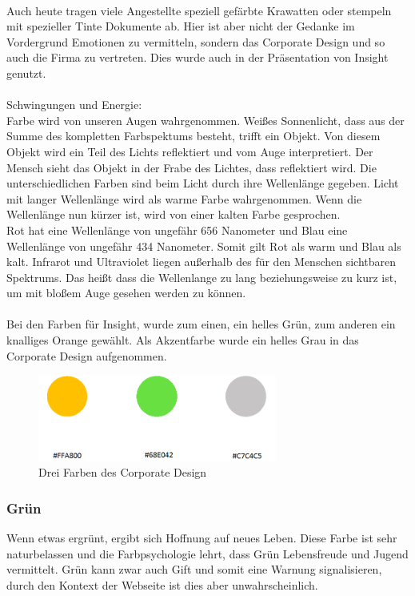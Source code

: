 \leavevmode \\
Auch heute tragen viele Angestellte speziell gefärbte Krawatten oder stempeln mit spezieller Tinte Dokumente ab. Hier ist aber nicht der Gedanke im Vordergrund Emotionen zu vermitteln, sondern das Corporate Design und so auch die Firma zu vertreten. Dies wurde auch in der Präsentation von Insight genutzt.
\leavevmode \\
\leavevmode \\
Schwingungen und Energie\cite{farbwirkung}:
\leavevmode \\
Farbe wird von unseren Augen wahrgenommen. Weißes Sonnenlicht, dass aus der Summe des kompletten Farbspektums besteht, trifft ein Objekt. Von diesem Objekt wird ein Teil des Lichts reflektiert und vom Auge interpretiert. Der Mensch sieht das Objekt in der Frabe des Lichtes, dass reflektiert wird. Die unterschiedlichen Farben sind beim Licht durch ihre Wellenlänge gegeben. Licht mit langer Wellenlänge wird als warme Farbe wahrgenommen. Wenn die Wellenlänge nun kürzer ist, wird von einer kalten Farbe gesprochen.
\leavevmode \\
Rot hat eine Wellenlänge von ungefähr 656 Nanometer und Blau eine Wellenlänge von ungefähr 434 Nanometer. Somit gilt Rot als warm und Blau als kalt. Infrarot und Ultraviolet liegen außerhalb des für den Menschen sichtbaren Spektrums. Das heißt dass die Wellenlange zu lang beziehungsweise zu kurz ist, um mit bloßem Auge gesehen werden zu können.
\leavevmode \\
\leavevmode \\
Bei den Farben für Insight, wurde zum einen, ein helles Grün, zum anderen ein knalliges Orange gewählt. Als Akzentfarbe wurde ein helles Grau in das Corporate Design aufgenommen.

\begin{figure}[H] 
  \centering
     \includegraphics[width=0.7\textwidth]{design_abb1.png}
  \caption{Drei Farben des Corporate Design}
\end{figure}

\subsubsection{Grün}
Wenn etwas ergrünt, ergibt sich Hoffnung auf neues Leben. Diese Farbe ist sehr naturbelassen und die Farbpsychologie lehrt, dass Grün Lebensfreude und Jugend vermittelt. Grün kann zwar auch Gift und somit eine Warnung signalisieren, durch den Kontext der Webseite ist dies aber unwahrscheinlich. \cite{farblehre}


